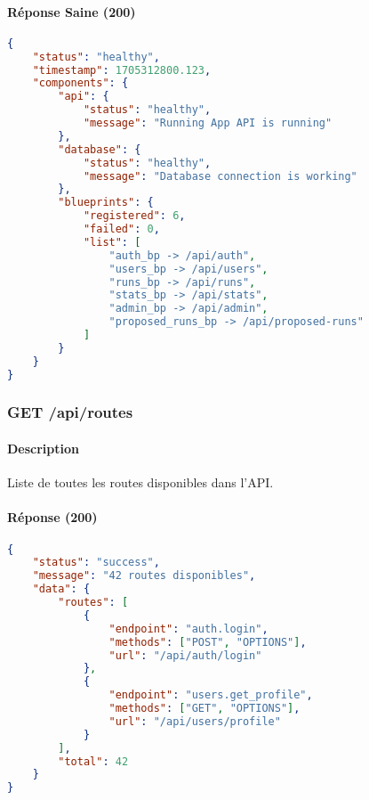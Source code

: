 \paragraph{Réponse Saine (200)}
\begin{lstlisting}[language=json]
{
    "status": "healthy",
    "timestamp": 1705312800.123,
    "components": {
        "api": {
            "status": "healthy",
            "message": "Running App API is running"
        },
        "database": {
            "status": "healthy",
            "message": "Database connection is working"
        },
        "blueprints": {
            "registered": 6,
            "failed": 0,
            "list": [
                "auth_bp -> /api/auth",
                "users_bp -> /api/users",
                "runs_bp -> /api/runs",
                "stats_bp -> /api/stats",
                "admin_bp -> /api/admin",
                "proposed_runs_bp -> /api/proposed-runs"
            ]
        }
    }
}
\end{lstlisting}

\subsubsection{GET /api/routes}

\paragraph{Description}
Liste de toutes les routes disponibles dans l'API.

\paragraph{Réponse (200)}
\begin{lstlisting}[language=json]
{
    "status": "success",
    "message": "42 routes disponibles",
    "data": {
        "routes": [
            {
                "endpoint": "auth.login",
                "methods": ["POST", "OPTIONS"],
                "url": "/api/auth/login"
            },
            {
                "endpoint": "users.get_profile",
                "methods": ["GET", "OPTIONS"],
                "url": "/api/users/profile"
            }
        ],
        "total": 42
    }
}
\end{lstlisting}